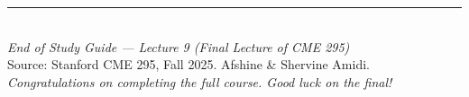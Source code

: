\documentclass[11pt, a4paper]{article}
\begin{document}
\vspace{1em}
\begin{center}
\rule{0.5\textwidth}{0.4pt}\\[6pt]
{\small\textit{End of Study Guide --- Lecture 9 (Final Lecture of CME 295)}}\\[4pt]
{\small Source: Stanford CME 295, Fall 2025. Afshine \& Shervine Amidi.}\\[4pt]
{\small\textit{Congratulations on completing the full course. Good luck on the final!}}
\end{center}
\end{document}
